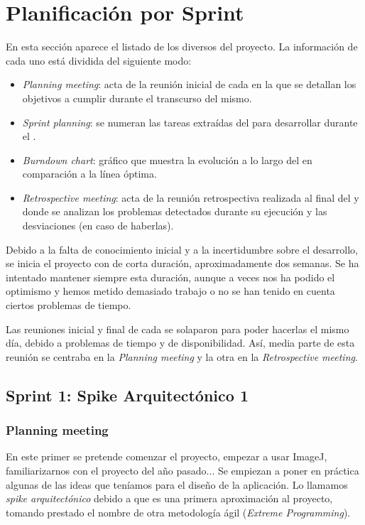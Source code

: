 \section{Planificación por Sprint}
En esta sección aparece el listado de los diversos \sprints{} del proyecto. La información de cada uno está dividida del siguiente modo:
\begin{itemize}
 \item \textit{Planning meeting}: acta de la reunión inicial de cada \sprint{} en la que se detallan los objetivos a cumplir durante el transcurso del mismo.
 \item \textit{Sprint planning}: se numeran las tareas extraídas del \productbacklog{} para desarrollar durante el \sprint{}.
 \item \textit{Burndown chart}: gráfico que muestra la evolución a lo largo del \sprint{} en comparación a la línea óptima.
 \item \textit{Retrospective meeting}: acta de la reunión retrospectiva realizada al final del \sprint{} y donde se analizan los problemas detectados durante su ejecución y las desviaciones (en caso de haberlas).
\end{itemize}

Debido a la falta de conocimiento inicial y a la incertidumbre sobre el desarrollo, se inicia el proyecto con \sprints{} de corta duración, aproximadamente dos semanas. Se ha intentado mantener siempre esta duración, aunque a veces nos ha podido el optimismo y hemos metido demasiado trabajo o no se han tenido en cuenta ciertos problemas de tiempo.

Las reuniones inicial y final de cada \sprint{} se solaparon para poder hacerlas el mismo día, debido a problemas de tiempo y de disponibilidad. Así, media parte de esta reunión se centraba en la \textit{Planning meeting} y la otra en la \textit{Retrospective meeting}.


\subsection{Sprint 1: Spike Arquitectónico 1}
\subsubsection*{Planning meeting}
En este primer \sprint{} se pretende comenzar el proyecto, empezar a usar ImageJ, familiarizarnos con el proyecto del año pasado... Se empiezan a poner en práctica algunas de las ideas que teníamos para el diseño de la aplicación. Lo llamamos \textit{spike arquitectónico} debido a que es una primera aproximación al proyecto, tomando prestado el nombre de otra metodología ágil (\textit{Extreme Programming}).

